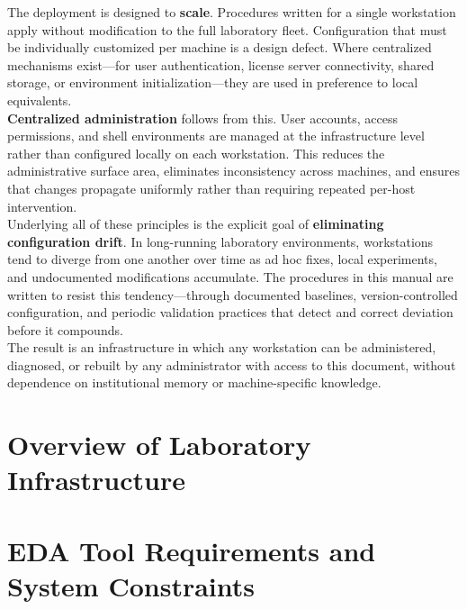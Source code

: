 The deployment is designed to \textbf{scale}. Procedures written for a single workstation apply
without modification to the full laboratory fleet. Configuration that must be individually
customized per machine is a design defect. Where centralized mechanisms exist---for user
authentication, license server connectivity, shared storage, or environment initialization---they
are used in preference to local equivalents.\\

\textbf{Centralized administration} follows from this. User accounts, access permissions, and
shell environments are managed at the infrastructure level rather than configured locally on each
workstation. This reduces the administrative surface area, eliminates inconsistency across
machines, and ensures that changes propagate uniformly rather than requiring repeated per-host
intervention.\\

Underlying all of these principles is the explicit goal of \textbf{eliminating configuration
drift}. In long-running laboratory environments, workstations tend to diverge from one another
over time as ad hoc fixes, local experiments, and undocumented modifications accumulate. The
procedures in this manual are written to resist this tendency---through documented baselines,
version-controlled configuration, and periodic validation practices that detect and correct
deviation before it compounds.\\

The result is an infrastructure in which any workstation can be administered, diagnosed, or
rebuilt by any administrator with access to this document, without dependence on institutional
memory or machine-specific knowledge.


\section{Overview of Laboratory Infrastructure}
\section{EDA Tool Requirements and System Constraints}

